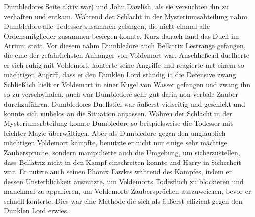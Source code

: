 \documentclass[a4paper, 10pt]{article}
\begin{document}
Dumbledores Seite aktiv war) und John Dawlish, als sie versuchten ihn zu verhaften und entkam. Während der Schlacht in der Mysteriumsabteilung nahm Dumbledore alle Todesser zusammen gefangen, die nicht einmal alle Ordensmitglieder zusammen besiegen konnte. Kurz danach fand das Duell im Atrium statt. Vor diesem nahm Dumbledore auch Bellatrix Lestrange gefangen, die eine der gefährlichsten Anhänger von Voldemort war. Anschließend duellierte er sich ruhig mit Voldemort, konterte seine Angriffe und reagierte mit einem so mächtigen Angriff, dass er den Dunklen Lord ständig in die Defensive zwang. Schließlich hielt er Voldemort in einer Kugel von Wasser gefangen und zwang ihn so zu verschwinden. auch war Dumbledore sehr gut darin non-verbale Zauber durchzuführen. Dumbledores Duellstiel war äußerst vielseitig und geschickt und konnte sich mühelos an die Situation anpassen. Währen der Schlacht in der Mysteriumsabteilung konnte Dumbledore so beispielsweise die Todesser mit leichter Magie überwältigen. Aber als Dumbledore gegen den unglaublich mächtigen Voldemort kämpfte, benutzte er nicht nur einige sehr mächtige Zaubersprüche, sondern manipulierte auch die Umgebung, um sicherzustellen, dass Bellatrix nicht in den Kampf einschreiten konnte und Harry in Sicherheit war. Er nutzte auch seinen Phönix Fawkes während des Kampfes, indem er dessen Unsterblichkeit ausnutzte, um Voldemorts Todesfluch zu blockieren und manchmal zu apparieren, um Voldemorts Zaubersprüchen auszuweichen, bevor er schnell konterte. Dies war eine Methode die sich als äußerst effizient gegen den Dunklen Lord erwies.
\end{document}
